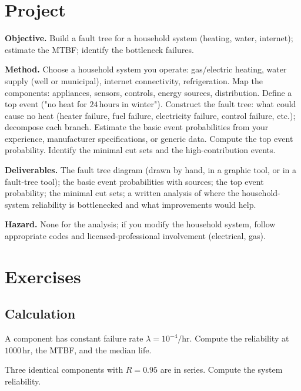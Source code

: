 \section{Project}

\begin{project}
\textbf{Objective.} Build a fault tree for a household system (heating, water, internet); estimate the MTBF; identify the bottleneck failures.

\textbf{Method.} Choose a household system you operate: gas/electric heating, water supply (well or municipal), internet connectivity, refrigeration. Map the components: appliances, sensors, controls, energy sources, distribution. Define a top event ("no heat for $24\,\text{hours}$ in winter"). Construct the fault tree: what could cause no heat (heater failure, fuel failure, electricity failure, control failure, etc.); decompose each branch. Estimate the basic event probabilities from your experience, manufacturer specifications, or generic data. Compute the top event probability. Identify the minimal cut sets and the high-contribution events.

\textbf{Deliverables.} The fault tree diagram (drawn by hand, in a graphic tool, or in a fault-tree tool); the basic event probabilities with sources; the top event probability; the minimal cut sets; a written analysis of where the household-system reliability is bottlenecked and what improvements would help.

\textbf{Hazard.} None for the analysis; if you modify the household system, follow appropriate codes and licensed-professional involvement (electrical, gas).
\end{project}

\section{Exercises}

\subsection*{Calculation}

\begin{exercise}
A component has constant failure rate $\lambda = 10^{-4}/\text{hr}$. Compute the reliability at $1000\,\text{hr}$, the MTBF, and the median life.
\end{exercise}

\begin{exercise}
Three identical components with $R = 0.95$ are in series. Compute the system reliability.
\end{exercise}

